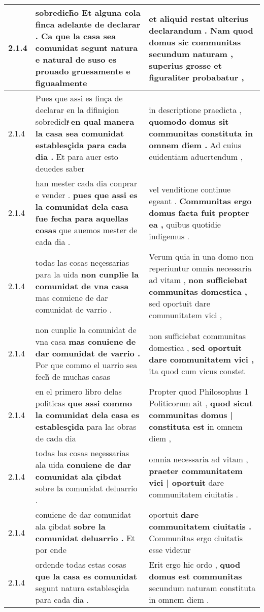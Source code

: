 \begin{tabular}{|p{1cm}|p{6.5cm}|p{6.5cm}|}
2.1.4 & sobredich̃o Et alguna cola finca adelante de declarar . \textbf{ Ca que la casa sea comunidat } segunt natura e natural de suso es prouado gruesamente e figuaalmente & et aliquid restat ulterius declarandum . \textbf{ Nam quod domus sic communitas secundum naturam , } superius grosse et figuraliter probabatur , \\\hline
2.1.4 & Pues que assi es finça de declarar en la difiniçion sobredichͣ \textbf{ en qual manera la casa sea comunidat establesçida para cada dia . } Et para auer esto deuedes saber & in descriptione praedicta , \textbf{ quomodo domus sit communitas constituta in omnem diem . } Ad cuius euidentiam aduertendum , \\\hline
2.1.4 & han mester cada dia conprar e vender . \textbf{ pues que assi es la comunidat dela casa fue fecha para aquellas cosas } que auemos mester de cada dia . & vel venditione continue egeant . \textbf{ Communitas ergo domus facta fuit propter ea , } quibus quotidie indigemus . \\\hline
2.1.4 & todas las cosas neçessarias para la uida \textbf{ non cunplie la comunidat de vna casa } mas conuiene de dar comunidat de varrio . & Verum quia in una domo non reperiuntur omnia necessaria ad vitam , \textbf{ non sufficiebat communitas domestica , } sed oportuit dare communitatem vici , \\\hline
2.1.4 & non cunplie la comunidat de vna casa \textbf{ mas conuiene de dar comunidat de varrio . } Por que commo el uarrio sea fech̃ de muchas casas & non sufficiebat communitas domestica , \textbf{ sed oportuit dare communitatem vici , } ita quod cum vicus constet \\\hline
2.1.4 & en el primero libro delas politicas \textbf{ que assi commo la comunidat dela casa es establesçida } para las obras de cada dia & Propter quod Philosophus 1 Politicorum ait , \textbf{ quod sicut communitas domus | constituta est } in omnem diem , \\\hline
2.1.4 & todas las cosas neçessarias ala uida \textbf{ conuiene de dar comunidat ala çibdat } sobre la comunidat deluarrio . & omnia necessaria ad vitam , \textbf{ praeter communitatem vici | oportuit } dare communitatem ciuitatis . \\\hline
2.1.4 & conuiene de dar comunidat ala çibdat \textbf{ sobre la comunidat deluarrio . } Et por ende & oportuit \textbf{ dare communitatem ciuitatis . } Communitas ergo ciuitatis esse videtur \\\hline
2.1.4 & ordende todas estas cosas \textbf{ que la casa es comunidat } segunt natura establesçida para cada dia . & Erit ergo hic ordo , \textbf{ quod domus est communitas } secundum naturam constituta in omnem diem . \\\hline

\end{tabular}
